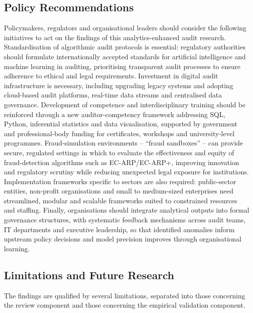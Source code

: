 \documentclass[preprint,12pt]{elsarticle}
\begin{document}
\subsection{Policy Recommendations}

Policymakers, regulators and organisational leaders should consider the following initiatives to act on the findings of this analytics-enhanced audit research. Standardisation of algorithmic audit protocols is essential: regulatory authorities should formulate internationally accepted standards for artificial intelligence and machine learning in auditing, prioritising transparent audit processes to ensure adherence to ethical and legal requirements. Investment in digital audit infrastructure is necessary, including upgrading legacy systems and adopting cloud-based audit platforms, real-time data streams and centralised data governance. Development of competence and interdisciplinary training should be reinforced through a new auditor-competency framework addressing SQL, Python, inferential statistics and data visualisation, supported by government and professional-body funding for certificates, workshops and university-level programmes. Fraud-simulation environments -- ``fraud sandboxes'' -- can provide secure, regulated settings in which to evaluate the effectiveness and equity of fraud-detection algorithms such as EC-ARP/EC-ARP+, improving innovation and regulatory scrutiny while reducing unexpected legal exposure for institutions. Implementation frameworks specific to sectors are also required: public-sector entities, non-profit organisations and small to medium-sized enterprises need streamlined, modular and scalable frameworks suited to constrained resources and staffing. Finally, organisations should integrate analytical outputs into formal governance structures, with systematic feedback mechanisms across audit teams, IT departments and executive leadership, so that identified anomalies inform upstream policy decisions and model precision improves through organisational learning.

\subsection{Limitations and Future Research}
\label{sec:limitations}

The findings are qualified by several limitations, separated into those concerning the review component and those concerning the empirical validation component.
\end{document}
